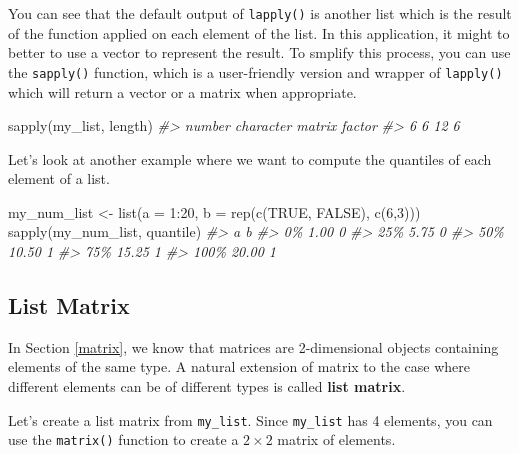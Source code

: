 \documentclass[
]{book}
\newenvironment{Shaded}{\begin{snugshade}}{\end{snugshade}}
\newcommand{\AttributeTok}[1]{\textcolor[rgb]{0.77,0.63,0.00}{#1}}
\newcommand{\CommentTok}[1]{\textcolor[rgb]{0.56,0.35,0.01}{\textit{#1}}}
\newcommand{\ConstantTok}[1]{\textcolor[rgb]{0.00,0.00,0.00}{#1}}
\newcommand{\DecValTok}[1]{\textcolor[rgb]{0.00,0.00,0.81}{#1}}
\newcommand{\FunctionTok}[1]{\textcolor[rgb]{0.00,0.00,0.00}{#1}}
\newcommand{\NormalTok}[1]{#1}
\newcommand{\OtherTok}[1]{\textcolor[rgb]{0.56,0.35,0.01}{#1}}
\newcommand{\SpecialCharTok}[1]{\textcolor[rgb]{0.00,0.00,0.00}{#1}}
\begin{document}
You can see that the default output of \texttt{lapply()} is another list which is the result of the function applied on each element of the list. In this application, it might to better to use a vector to represent the result. To smplify this process, you can use the \texttt{sapply()} function, which is a user-friendly version and wrapper of \texttt{lapply()} which will return a vector or a matrix when appropriate.

\begin{Shaded}
\begin{Highlighting}[]
\FunctionTok{sapply}\NormalTok{(my\_list, length)}
\CommentTok{\#\textgreater{}    number character    matrix    factor }
\CommentTok{\#\textgreater{}         6         6        12         6}
\end{Highlighting}
\end{Shaded}

Let's look at another example where we want to compute the quantiles of each element of a list.

\begin{Shaded}
\begin{Highlighting}[]
\NormalTok{my\_num\_list }\OtherTok{\textless{}{-}} \FunctionTok{list}\NormalTok{(}\AttributeTok{a =} \DecValTok{1}\SpecialCharTok{:}\DecValTok{20}\NormalTok{, }\AttributeTok{b =} \FunctionTok{rep}\NormalTok{(}\FunctionTok{c}\NormalTok{(}\ConstantTok{TRUE}\NormalTok{, }\ConstantTok{FALSE}\NormalTok{), }\FunctionTok{c}\NormalTok{(}\DecValTok{6}\NormalTok{,}\DecValTok{3}\NormalTok{)))}
\FunctionTok{sapply}\NormalTok{(my\_num\_list, quantile)}
\CommentTok{\#\textgreater{}          a b}
\CommentTok{\#\textgreater{} 0\%    1.00 0}
\CommentTok{\#\textgreater{} 25\%   5.75 0}
\CommentTok{\#\textgreater{} 50\%  10.50 1}
\CommentTok{\#\textgreater{} 75\%  15.25 1}
\CommentTok{\#\textgreater{} 100\% 20.00 1}
\end{Highlighting}
\end{Shaded}

\hypertarget{list-matrix}{%
\subsection{List Matrix}\label{list-matrix}}

In Section \ref{matrix}, we know that matrices are 2-dimensional objects containing elements of the same type. A natural extension of matrix to the case where different elements can be of different types is called \textbf{list matrix}.

Let's create a list matrix from \texttt{my\_list}. Since \texttt{my\_list} has 4 elements, you can use the \texttt{matrix()} function to create a \(2\times 2\) matrix of elements.
\end{document}
